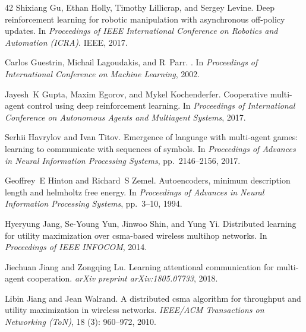 \documentclass{article} %
\begin{document}
\begin{thebibliography}{42}
Shixiang Gu, Ethan Holly, Timothy Lillicrap, and Sergey Levine.
\newblock Deep reinforcement learning for robotic manipulation with
  asynchronous off-policy updates.
\newblock In \emph{Proceedings of IEEE International Conference on Robotics and
  Automation (ICRA)}. IEEE, 2017.

Carlos Guestrin, Michail Lagoudakis, and R~Parr.
.
\newblock In \emph{Proceedings of International Conference on Machine
  Learning}, 2002.

Jayesh~K Gupta, Maxim Egorov, and Mykel Kochenderfer.
\newblock Cooperative multi-agent control using deep reinforcement learning.
\newblock In \emph{Proceedings of International Conference on Autonomous Agents
  and Multiagent Systems}, 2017.

Serhii Havrylov and Ivan Titov.
\newblock Emergence of language with multi-agent games: learning to communicate
  with sequences of symbols.
\newblock In \emph{Proceedings of Advances in Neural Information Processing
  Systems}, pp.\  2146--2156, 2017.

Geoffrey~E Hinton and Richard~S Zemel.
\newblock Autoencoders, minimum description length and helmholtz free energy.
\newblock In \emph{Proceedings of Advances in Neural Information Processing
  Systems}, pp.\  3--10, 1994.

Hyeryung Jang, Se-Young Yun, Jinwoo Shin, and Yung Yi.
\newblock Distributed learning for utility maximization over csma-based
  wireless multihop networks.
\newblock In \emph{Proceedings of IEEE INFOCOM}, 2014.

Jiechuan Jiang and Zongqing Lu.
\newblock Learning attentional communication for multi-agent cooperation.
\newblock \emph{arXiv preprint arXiv:1805.07733}, 2018.

Libin Jiang and Jean Walrand.
\newblock A distributed csma algorithm for throughput and utility maximization
  in wireless networks.
\newblock \emph{IEEE/ACM Transactions on Networking (ToN)}, 18
  (3): 960--972, 2010.


\end{thebibliography}
\end{document}
